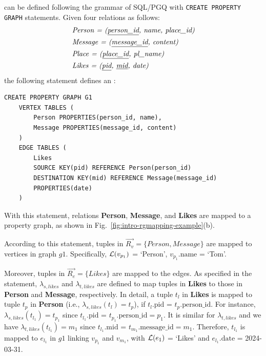 \begin{example}
    \label{example:rgmapping}
     can be defined following the grammar of SQL/PGQ with \lstinline{CREATE PROPERTY GRAPH} statements. 
    Given four relations as follows:
    \begin{equation*}
        \begin{split}
            & \textit{Person = (\underline{person\_id}, name, place\_id)} \\
            & \textit{Message = (\underline{message\_id}, content)} \\
            & \textit{Place = (\underline{place\_id}, pl\_name)} \\
            & \textit{Likes = (\underline{pid}, \underline{mid}, date)}
        \end{split}
    \end{equation*}
    the following statement defines an \rgmapping:
    \begin{lstlisting}
CREATE PROPERTY GRAPH G1
    VERTEX TABLES (
        Person PROPERTIES(person_id, name),
        Message PROPERTIES(message_id, content)
    )
    EDGE TABLES (
        Likes 
        SOURCE KEY(pid) REFERENCE Person(person_id) 
        DESTINATION KEY(mid) REFERENCE Message(message_id) 
        PROPERTIES(date)
    )
    \end{lstlisting}
    With this statement, relations \textbf{Person}, \textbf{Message}, and \textbf{Likes} are mapped to a property graph, as shown in Fig.~\ref{fig:intro-rgmapping-example}(b).

    According to this statement, tuples in \(\vec{R_v} = \{Person, Message\}\) are mapped to vertices in graph $g1$.
    Specifically, \(\mathcal{L}(v_{p_1})\) = `Person', \(v_{p_1}\text{.name}\) = `Tom'.


    Moreover, tuples in \(\vec{R_e} = \{Likes\}\) are mapped to the edges.
    As specified in the statement, $\lambda_{s, likes}$ and $\lambda_{t, likes}$ are defined to map tuples in \textbf{Likes} to those in \textbf{Person} and \textbf{Message}, respectively.
    In detail, a tuple $t_l$ in \textbf{Likes} is mapped to tuple $t_p$ in \textbf{Person} (i.e., \(\lambda_{s, likes}(t_l) = t_p\)), if \(t_l\text{.pid}\) = \(t_p\text{.person\_id}\).
    For instance, $\lambda_{s, likes}(t_{l_1}) = t_{p_1}$ since \(t_{l_1}\text{.pid}\) = \(t_{p_1}\text{.person\_id} = p_1\).
    It is similar for \(\lambda_{t, likes}\) and we have $\lambda_{t, likes}(t_{l_1}) = m_1$ since \(t_{l_1}\text{.mid}\) = \(t_{m_1}\text{.message\_id} = m_1\).
    Therefore, $t_{l_1}$ is mapped to $e_{l_1}$ in $g1$ linking $v_{p_1}$ and $v_{m_1}$, with \(\mathcal{L}(e_1)\) = `Likes' and \(e_{l_1}\text{.date}\) = 2024-03-31.

\end{example}

